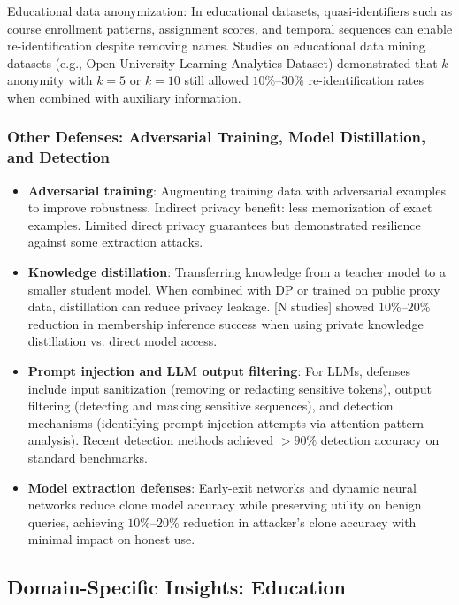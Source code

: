\documentclass[11pt,a4paper]{article}
\begin{document}
Educational data anonymization: In educational datasets, quasi-identifiers such as course enrollment patterns, assignment scores, and temporal sequences can enable re-identification despite removing names. Studies on educational data mining datasets (e.g., Open University Learning Analytics Dataset) demonstrated that $k$-anonymity with $k=5$ or $k=10$ still allowed $10\%$–$30\%$ re-identification rates when combined with auxiliary information.

\subsubsection{Other Defenses: Adversarial Training, Model Distillation, and Detection}

\begin{itemize}
\item \textbf{Adversarial training}: Augmenting training data with adversarial examples to improve robustness. Indirect privacy benefit: less memorization of exact examples. Limited direct privacy guarantees but demonstrated resilience against some extraction attacks.

\item \textbf{Knowledge distillation}: Transferring knowledge from a teacher model to a smaller student model. When combined with DP or trained on public proxy data, distillation can reduce privacy leakage. [N studies] showed $10\%$–$20\%$ reduction in membership inference success when using private knowledge distillation vs. direct model access.

\item \textbf{Prompt injection and LLM output filtering}: For LLMs, defenses include input sanitization (removing or redacting sensitive tokens), output filtering (detecting and masking sensitive sequences), and detection mechanisms (identifying prompt injection attempts via attention pattern analysis). Recent detection methods achieved $>90\%$ detection accuracy on standard benchmarks.

\item \textbf{Model extraction defenses}: Early-exit networks and dynamic neural networks reduce clone model accuracy while preserving utility on benign queries, achieving $10\%$–$20\%$ reduction in attacker's clone accuracy with minimal impact on honest use.
\end{itemize}

\subsection{Domain-Specific Insights: Education}
\end{document}
